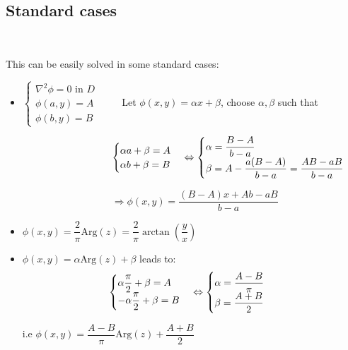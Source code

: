 \subsection{Standard cases}\hfill\\\par
\noindent This can be easily solved in some standard cases:
\par\bigskip
\begin{itemize}
  \item$\begin{cases}\nabla^2\phi=0\text{ in $D$}\\\phi(a,y) = A\\\phi(b,y)=B\end{cases}\qquad$ Let $\phi(x,y) = \alpha x+\beta$, choose $\alpha,\beta$ such that\par$\quad\qquad\qquad\qquad\qquad\begin{cases}\alpha a+\beta = A\\\alpha b+\beta = B\end{cases}\Leftrightarrow\begin{cases}\alpha = \dfrac{B-A}{b-a}\\\beta = A-\dfrac{a(B-A)}{b-a}=\dfrac{AB-aB}{b-a}\end{cases}$\par\bigskip
    $\quad\qquad\qquad\qquad\qquad\Rightarrow\phi(x,y) = \dfrac{(B-A)x+Ab-aB}{b-a}$
    \par\bigskip
  \item $\phi(x,y) = \dfrac{2}{\pi}\text{Arg}(z) = \dfrac{2}{\pi}\arctan\left(\dfrac{y}{x}\right)$
    \par\bigskip
  \item $\phi(x,y) = \alpha\text{Arg}(z)+\beta$ leads to:
    \begin{equation*}
      \begin{gathered}
        \begin{cases}
          \alpha\dfrac{\pi}{2}+\beta = A\\
          -\alpha\dfrac{\pi}{2}+\beta = B
          \end{cases}\Leftrightarrow\begin{cases}
        \alpha = \dfrac{A-B}{\pi}\\\beta = \dfrac{A+B}{2}\end{cases}
      \end{gathered}
    \end{equation*}\par
    i.e $\phi(x,y) = \dfrac{A-B}{\pi}\text{Arg}(z)+\dfrac{A+B}{2}$
    \par\bigskip

\end{itemize}
